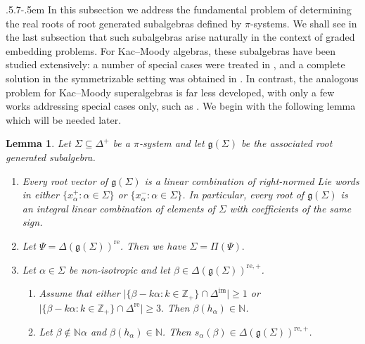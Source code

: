 \documentclass[11pt,reqno]{amsart}
\makeatletter
\theoremstyle{plain}
\newtheorem*{lemma}{Lemma}
\theoremstyle{definition}
\theoremstyle{remark}
\newcommand{\lie}[1]{\mathfrak{#1}}
\numberwithin{equation}{section}
\def\subsection{\def\@secnumfont{\bfseries}\@startsection{subsection}{2}%
  {\parindent}{.5\linespacing\@plus.7\linespacing}{-.5em}%
  {\normalfont\bfseries}}
\makeatother
\begin{document}
\subsection{} In this subsection we address the fundamental problem of determining the real roots of root generated subalgebras defined by $\pi$-systems. We shall see in the last subsection that such subalgebras arise naturally in the context of graded embedding problems. For Kac–Moody algebras, these subalgebras have been studied extensively: a number of special cases were treated in \cite{biswas23onsymmetric, habib2024pisystems, morita1989certain, naito1992regular, roy2019maximal, viswanath08embedding}, and a complete solution in the symmetrizable setting was obtained in \cite{idv2023root}. In contrast, the analogous problem for Kac–Moody superalgebras is far less developed, with only a few works addressing special cases only, such as \cite{Nayak13Embedding,vander87regular}. We begin with the following lemma which will be needed later.
\begin{lemma}\label{lempisystem}
    Let $\Sigma\subseteq\Delta^{\mathrm{+}}$ be a $\pi$-system and let $\lie g(\Sigma)$ be the associated root generated subalgebra.
    \begin{enumerate}
        \item Every root vector of $\mathfrak g(\Sigma)$ is a linear combination of right-normed Lie words in either $\{x_\alpha^{+} : \alpha \in \Sigma\}$ or $\{x_\alpha^{-} : \alpha \in \Sigma\}$. In particular, every root of $\mathfrak g(\Sigma)$ is an integral linear combination of elements of $\Sigma$ with coefficients of the same sign. \vspace{0,1cm}
        \item Let $\Psi=\Delta(\lie{g}(\Sigma))^{\mathrm{re}}$. Then we have $\Sigma=\Pi(\Psi).$ \vspace{0,1cm}
         \item Let $\alpha \in \Sigma$ be non-isotropic and let $\beta \in \Delta(\mathfrak g(\Sigma))^{\mathrm{re},+}$. \vspace{0,1cm}
        \begin{enumerate}
            \item Assume that either $\bigl|\{\beta - k\alpha : k \in \mathbb{Z}_+\} \cap \Delta^{\mathrm{im}}\bigr| \ge 1$
    or $\bigl|\{\beta - k\alpha : k \in \mathbb{Z}_+\} \cap \Delta^{\mathrm{re}}\bigr| \ge 3.$
    Then $\beta(h_\alpha) \in \mathbb{N}$.\vspace{0,1cm}
    \item Let $\beta \notin \mathbb{N}\alpha$ and $\beta(h_\alpha) \in \mathbb{N}$. Then $s_\alpha(\beta) \in \Delta(\mathfrak g(\Sigma))^{\mathrm{re},+}$.
        \end{enumerate}
    \end{enumerate}
\end{lemma}
\end{document}
